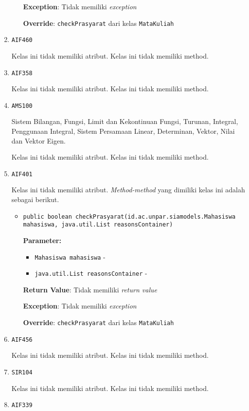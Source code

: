 \documentclass{article}
\begin{document}
\begin{enumerate}
\begin{itemize}
\textbf{Exception}: Tidak memiliki \textit{exception}

\textbf{Override}: \texttt{checkPrasyarat} dari kelas \texttt{MataKuliah}

\end{itemize}
\item \texttt{AIF460}



Kelas ini tidak memiliki atribut. Kelas ini tidak memiliki method. \item \texttt{AIF358}



Kelas ini tidak memiliki atribut. Kelas ini tidak memiliki method. \item \texttt{AMS100}

Sistem Bilangan, Fungsi, Limit dan Kekontinuan Fungsi, Turunan, Integral, 
 Penggunaan Integral, Sistem Persamaan Linear, Determinan, Vektor, Nilai dan 
 Vektor Eigen.

Kelas ini tidak memiliki atribut. Kelas ini tidak memiliki method. \item \texttt{AIF401}



Kelas ini tidak memiliki atribut. \textit{Method-method} yang dimiliki kelas ini adalah sebagai berikut.
\begin{itemize}
\item \texttt{public boolean checkPrasyarat(id.ac.unpar.siamodels.Mahasiswa mahasiswa, java.util.List reasonsContainer)}

\textbf{Parameter:}
\begin{itemize}
\item \texttt{Mahasiswa mahasiswa} - 
\item \texttt{java.util.List reasonsContainer} - 
\end{itemize}
\textbf{Return Value}: Tidak memiliki \textit{return value}

\textbf{Exception}: Tidak memiliki \textit{exception}

\textbf{Override}: \texttt{checkPrasyarat} dari kelas \texttt{MataKuliah}

\end{itemize}
\item \texttt{AIF456}



Kelas ini tidak memiliki atribut. Kelas ini tidak memiliki method. \item \texttt{SIR104}



Kelas ini tidak memiliki atribut. Kelas ini tidak memiliki method. \item \texttt{AIF339}




\end{enumerate}
\end{document}
